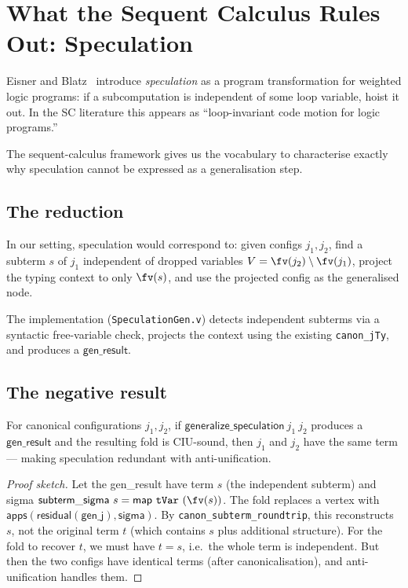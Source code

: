 \section{What the Sequent Calculus Rules Out: Speculation}
\label{sec:speculation}

Eisner and Blatz~\cite{eisner-blatz-2007-parsing} introduce \emph{speculation}
as a program transformation for weighted logic programs: if a subcomputation
is independent of some loop variable, hoist it out.  In the SC literature this
appears as ``loop-invariant code motion for logic programs.''

The sequent-calculus framework gives us the vocabulary to characterise exactly
why speculation cannot be expressed as a generalisation step.

\subsection{The reduction}

In our setting, speculation would correspond to: given configs $j_1, j_2$,
find a subterm $s$ of $j_1$ independent of dropped variables $V = \fv(j_2)
\setminus \fv(j_1)$, project the typing context to only $\fv(s)$, and use
the projected config as the generalised node.

The implementation (\texttt{SpeculationGen.v}) detects independent subterms
via a syntactic free-variable check, projects the context using the existing
\texttt{canon\_jTy}, and produces a $\mathsf{gen\_result}$.

\subsection{The negative result}

\begin{theorem}
For canonical configurations $j_1, j_2$, if $\mathsf{generalize\_speculation}\ j_1\ j_2$
produces a $\mathsf{gen\_result}$ and the resulting fold is CIU-sound, then
$j_1$ and $j_2$ have the same term --- making speculation redundant with
anti-unification.
\end{theorem}

\begin{proof}[Proof sketch]
Let the gen\_result have term $s$ (the independent subterm) and sigma
$\mathsf{subterm\_sigma}\ s = \mathsf{map}\ \mathtt{tVar}\ (\fv(s))$.
The fold replaces a vertex with
$\mathsf{apps}(\mathsf{residual}(\mathsf{gen\_j}), \mathsf{sigma})$.
By \texttt{canon\_subterm\_roundtrip}, this reconstructs $s$, not the
original term $t$ (which contains $s$ plus additional structure).
For the fold to recover $t$, we must have $t = s$, i.e.\ the whole term
is independent.  But then the two configs have identical terms (after
canonicalisation), and anti-unification handles them.
\end{proof}

